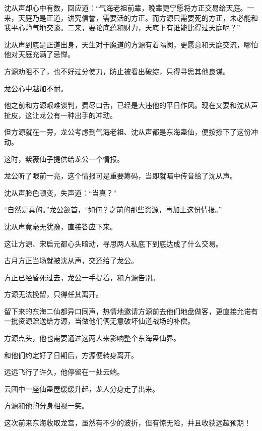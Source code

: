 \begin{this_body}
沈从声却心中有数，回应道：“气海老祖前辈，晚辈更宁愿将方正交易给天庭。一来，天庭乃是正道，讲究信誉，需要活的方正。而方源只需要死的方正，未必能和我平心静气地交谈。二来，要论底蕴和财力，天底下有谁能比得过天庭呢？”

沈从声到底是正道出身，天生对于魔道的方源有着隔阂，更愿意和天庭交流，哪怕他对天庭充满了忌惮。

方源劝阻不了，也不好过分使力，防止被看出破绽，只得寻思其他良谋。

龙公心中越加不耐。

他之前和方源艰难谈判，费尽口舌，已经是大违他的平日作风。现在又要和沈从声扯皮，这让龙公有一种出手的冲动。

但方源就在一旁，龙公考虑到气海老祖、沈从声都是东海蛊仙，便按捺下了这份冲动。

这时，紫薇仙子提供给龙公一个情报。

龙公听了眼前一亮，这个情报可是重要筹码，当即就暗中传音给了沈从声。

沈从声脸色顿变，失声道：“当真？”

“自然是真的。”龙公颔首，“如何？之前的那些资源，再加上这份情报。”

沈从声竟毫无犹豫，直接答应下来。

这让方源、宋启元都心头暗动，寻思两人私底下到底达成了什么交易。

古月方正当场就被沈从声，交还给了龙公。

方正已经昏死过去，龙公一手提着，和方源告别。

方源无法挽留，只得任其离开。

留下来的东海二仙都异口同声，热情地邀请方源前去他们地盘做客，更直接允诺有一批资源赠送给方源，当做他们俩无意破坏仙道战场的补偿。

方源点头，他也需要通过这两人来影响整个东海蛊仙界。

和他们约定好了日期后，方源便转身离开。

远远飞行了许久，他停留在一处云端。

云团中一座仙蛊屋缓缓升起，龙人分身走了出来。

方源和他的分身相视一笑。

这次前来东海收取龙宫，虽然有不少的波折，但有惊无险，并且收获远超预期！

\end{this_body}

